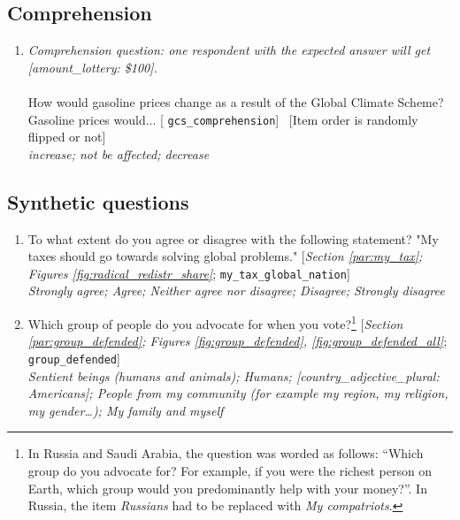  \subsection*{Comprehension} 
 \begin{enumerate}[resume] 
\item  \label{q:gcs_comprehension} \textit{Comprehension question: one respondent with the expected answer will get [amount\_lottery: \$100].}\\\\How would gasoline prices change as a result of the Global Climate Scheme? \\Gasoline prices would... [%
\verb|gcs_comprehension|]
~[Item order is randomly flipped or not]
  \\ \textit{increase; not be affected; decrease}

\end{enumerate} 

 \subsection*{Synthetic questions} 
 \begin{enumerate}[resume] 
\item  \label{q:my_tax_global_nation} To what extent do you agree or disagree with the following statement? "My taxes should go towards solving global problems." [\textit{Section \ref{par:my_tax}; Figures \ref{fig:radical_redistr_share}}; %
\verb|my_tax_global_nation|]
  \\ \textit{Strongly agree; Agree; Neither agree nor disagree; Disagree; Strongly disagree}

\item  \label{q:group_defended} Which group of people do you advocate for when you vote?\footnote{In Russia and Saudi Arabia, the question was worded as follows: ``Which group do you advocate for? For example, if you were the richest person on Earth, which group would you predominantly help with your money?''. In Russia, the item \textit{Russians} had to be replaced with \textit{My compatriots}.} [\textit{Section \ref{par:group_defended}; Figures \ref{fig:group_defended}, \ref{fig:group_defended_all}}; 
\verb|group_defended|] 
  \\ \textit{Sentient beings (humans and animals); Humans; [country\_adjective\_plural: Americans]; People from my community (for example my region, my religion, my gender…); My family and myself}

\end{enumerate} 


